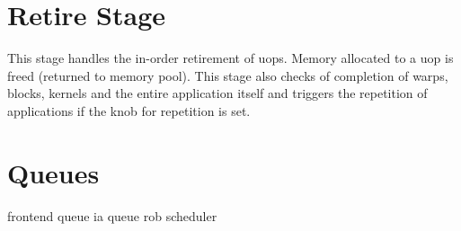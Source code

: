 \section{Retire Stage}

This stage handles the in-order retirement of uops. Memory allocated to a uop
is freed (returned to memory pool). This stage also checks of completion of
warps, blocks, kernels and the entire application itself and triggers the
repetition of applications if the knob for repetition is set.



\section{Queues}

frontend queue
ia queue
rob
scheduler


